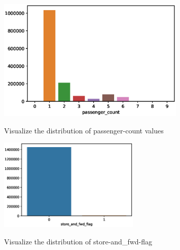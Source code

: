 \documentclass{amsart}
\begin{document}
\begin{figure}
  \centering
   \includegraphics[width=0.8\textwidth]{figure//fig-2.eps}\\
  \caption{Visualize the distribution of passenger-count values}\label{fig:demical1}
\end{figure}

\begin{figure}
  \centering
   \includegraphics[width=0.6\textwidth]{figure//fig-4.eps}\\
  \caption{Visualize the distribution of store-and_fwd-flag}\label{fig:demical1}
\end{figure}
\end{document}
